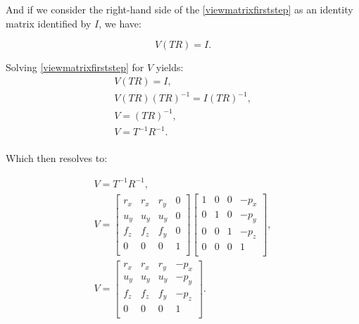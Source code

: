 \documentclass[cic,tc,english]{iiufrgs}
\begin{document}
And if we consider the right-hand side of the \cref{viewmatrixfirststep} as an identity matrix identified by $I$, we have:

\begin{equation}
\label{viewmatrixsecondstep}
    V ( T  R ) = I.
\end{equation}

Solving \cref{viewmatrixfirststep} for $V$ yields:
\begin{equation}
    \begin{array}{lc}
        V ( T  R ) = I,                         \\
        V  (T  R)  (T  R)^{-1} = I  (T R)^{-1}, \\
        V = (T R)^{-1},                         \\
        V = T^{-1} R^{-1}.                      \\
    \end{array}
\end{equation}

Which then resolves to:

\begin{equation}
        \begin{array}{lc}
        V = T^{-1} R^{-1}, \\
        V
        =
        \begin{bmatrix}
            r_x & r_x & r_y & 0 \\
            u_y & u_y & u_y & 0 \\
            f_z & f_z & f_y & 0 \\
            0   & 0   & 0   & 1 \\
        \end{bmatrix}

        \begin{bmatrix}
            1 & 0 & 0 & -p_x \\
            0 & 1 & 0 & -p_y \\
            0 & 0 & 1 & -p_z \\
            0 & 0 & 0 & 1    \\
        \end{bmatrix}
        ,\\
        V
        =
        \begin{bmatrix}
            r_x & r_x & r_y & -p_x \\
            u_y & u_y & u_y & -p_y \\
            f_z & f_z & f_y & -p_z \\
            0   & 0   & 0   & 1    \\
        \end{bmatrix}
        .
    \end{array}
\end{equation}
\end{document}

